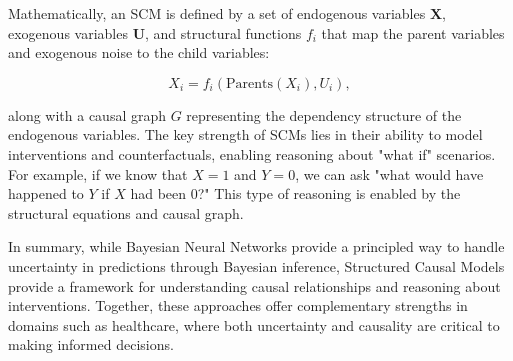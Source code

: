 \documentclass{article}
\begin{document}
Mathematically, an SCM is defined by a set of endogenous variables $\mathbf{X}$, exogenous variables $\mathbf{U}$, and structural functions $f_i$ that map the parent variables and exogenous noise to the child variables:

\[
X_i = f_i(\text{Parents}(X_i), U_i),
\]

along with a causal graph $G$ representing the dependency structure of the endogenous variables. The key strength of SCMs lies in their ability to model interventions and counterfactuals, enabling reasoning about "what if" scenarios. For example, if we know that $X = 1$ and $Y = 0$, we can ask "what would have happened to $Y$ if $X$ had been 0?" This type of reasoning is enabled by the structural equations and causal graph.

In summary, while Bayesian Neural Networks provide a principled way to handle uncertainty in predictions through Bayesian inference, Structured Causal Models provide a framework for understanding causal relationships and reasoning about interventions. Together, these approaches offer complementary strengths in domains such as healthcare, where both uncertainty and causality are critical to making informed decisions.
\end{document}
